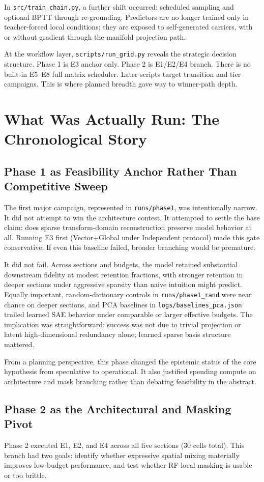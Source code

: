 \documentclass[11pt]{article}
\begin{document}
In \texttt{src/train\_chain.py}, a further shift occurred: scheduled sampling and optional BPTT through re-grounding. Predictors are no longer trained only in teacher-forced local conditions; they are exposed to self-generated carriers, with or without gradient through the manifold projection path.

At the workflow layer, \texttt{scripts/run\_grid.py} reveals the strategic decision structure. Phase 1 is E3 anchor only. Phase 2 is E1/E2/E4 branch. There is no built-in E5--E8 full matrix scheduler. Later scripts target transition and tier campaigns. This is where planned breadth gave way to winner-path depth.

\section{What Was Actually Run: The Chronological Story}
\subsection{Phase 1 as Feasibility Anchor Rather Than Competitive Sweep}
The first major campaign, represented in \texttt{runs/phase1}, was intentionally narrow. It did not attempt to win the architecture contest. It attempted to settle the base claim: does sparse transform-domain reconstruction preserve model behavior at all. Running E3 first (Vector+Global under Independent protocol) made this gate conservative. If even this baseline failed, broader branching would be premature.

It did not fail. Across sections and budgets, the model retained substantial downstream fidelity at modest retention fractions, with stronger retention in deeper sections under aggressive sparsity than naive intuition might predict. Equally important, random-dictionary controls in \texttt{runs/phase1\_rand} were near chance on deeper sections, and PCA baselines in \texttt{logs/baselines\_pca.json} trailed learned SAE behavior under comparable or larger effective budgets. The implication was straightforward: success was not due to trivial projection or latent high-dimensional redundancy alone; learned sparse basis structure mattered.

From a planning perspective, this phase changed the epistemic status of the core hypothesis from speculative to operational. It also justified spending compute on architecture and mask branching rather than debating feasibility in the abstract.

\subsection{Phase 2 as the Architectural and Masking Pivot}
Phase 2 executed E1, E2, and E4 across all five sections (30 cells total). This branch had two goals: identify whether expressive spatial mixing materially improves low-budget performance, and test whether RF-local masking is usable or too brittle.
\end{document}
